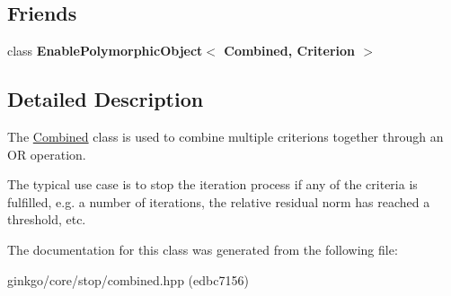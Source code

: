 \subsection*{Friends}
\begin{DoxyCompactItemize}
\item 
\mbox{\label{classgko_1_1stop_1_1Combined_a7c6977e97337814148e9c8ba5801ebf9}} 
class {\bfseries Enable\+Polymorphic\+Object$<$ Combined, Criterion $>$}
\end{DoxyCompactItemize}


\subsection{Detailed Description}
The \hyperlink{classgko_1_1stop_1_1Combined}{Combined} class is used to combine multiple criterions together through an OR operation. 

The typical use case is to stop the iteration process if any of the criteria is fulfilled, e.\+g. a number of iterations, the relative residual norm has reached a threshold, etc. 

The documentation for this class was generated from the following file\+:\begin{DoxyCompactItemize}
\item 
ginkgo/core/stop/combined.\+hpp (edbc7156)\end{DoxyCompactItemize}
